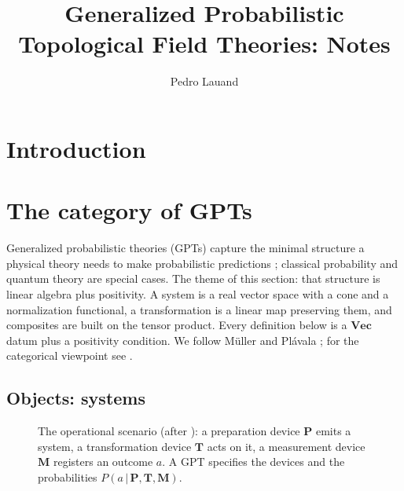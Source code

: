 \documentclass[prl,aps,10pt,superscriptaddress, floatfix]{revtex4-2}
\begin{document}
\title{Generalized Probabilistic Topological Field Theories: Notes}
\author{Pedro Lauand}

\maketitle
\section{Introduction}

\section{The category of GPTs}

Generalized probabilistic theories (GPTs) capture the minimal structure a physical theory needs to make probabilistic predictions \cite{Hardy2001,Barrett2007,Mueller2021,Plavala2023}; classical probability and quantum theory are special cases. The theme of this section: that structure is linear algebra plus positivity. A system is a real vector space with a cone and a normalization functional, a transformation is a linear map preserving them, and composites are built on the tensor product. Every definition below is a $\mathbf{Vec}$ datum plus a positivity condition. We follow M\"uller \cite{Mueller2021} and Pl\'avala \cite{Plavala2023}; for the categorical viewpoint see \cite{ChiribellaDArianoPerinotti2010,GogiosoScandolo2018}.

\subsection{Objects: systems}

\begin{figure}[t]
\centering
{}
\caption{The operational scenario (after \cite{Mueller2021}): a preparation device $\mathbf P$ emits a system, a transformation device $\mathbf T$ acts on it, a measurement device $\mathbf M$ registers an outcome $a$. A GPT specifies the devices and the probabilities $P(a\,|\,\mathbf P,\mathbf T,\mathbf M)$.}
\label{fig:ptm}
\end{figure}
\end{document}
